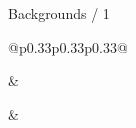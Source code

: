 \documentclass[aspectratio=169]{beamer}
\begin{document}
\begin{frame}{Backgrounds / 1}
\centering
\setlength{\tabcolsep}{0pt}
\begin{tabular}{@{}p{0.33\textwidth}p{0.33\textwidth}p{0.33\textwidth}@{}}
\centering\colorbox{bitpolito-light}{\parbox[c][0.95cm][c]{0.85\linewidth}{\centering{}}}\par{} & \centering\colorbox{bitpolito-light}{\parbox[c][0.95cm][c]{0.85\linewidth}{\centering{}}}\par{} & \tabularnewline[0.24cm]
\end{tabular}
\end{frame}
\end{document}
